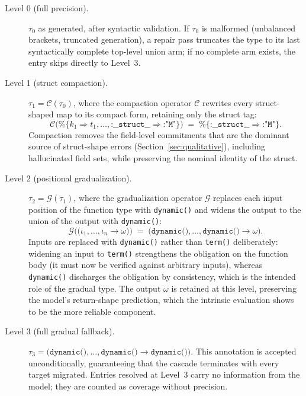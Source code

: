 \begin{description}
    \item[Level 0 (full precision).]
    $\tau_0$ as generated, after syntactic validation.
    If $\tau_0$ is malformed (unbalanced brackets, truncated generation), a repair pass truncates the type to its last syntactically complete top-level union arm; if no complete arm exists, the entry skips directly to Level~3.

    \item[Level 1 (struct compaction).]
    $\tau_1 = \mathcal{C}(\tau_0)$, where the compaction operator $\mathcal{C}$ rewrites every struct-shaped map to its compact form, retaining only the struct tag:
    \[
    \mathcal{C}\bigl(\texttt{\%\{}k_1 \Rightarrow t_1, \ldots, \texttt{:\_\_struct\_\_} \Rightarrow \texttt{:"M"}\texttt{\}}\bigr)
    \;=\;
    \texttt{\%\{:\_\_struct\_\_} \Rightarrow \texttt{:"M"\}}.
    \]
    Compaction removes the field-level commitments that are the dominant source of struct-shape errors (Section~\ref{sec:qualitative}), including hallucinated field sets, while preserving the nominal identity of the struct.

    \item[Level 2 (positional gradualization).]
    $\tau_2 = \mathcal{G}(\tau_1)$, where the gradualization operator $\mathcal{G}$ replaces each input position of the function type with \texttt{dynamic()} and widens the output to the union of the output with \texttt{dynamic()}:
    \[
    \mathcal{G}\bigl(\texttt{(} \iota_1, \ldots, \iota_n \rightarrow \omega \texttt{)}\bigr)
    \;=\;
    \texttt{(dynamic()}, \ldots, \texttt{dynamic()} \rightarrow \omega\texttt{)}.
    \]
    Inputs are replaced with \texttt{dynamic()} rather than \texttt{term()} deliberately: widening an input to \texttt{term()} strengthens the obligation on the function body (it must now be verified against arbitrary inputs), whereas \texttt{dynamic()} discharges the obligation by consistency, which is the intended role of the gradual type.
    The output $\omega$ is retained at this level, preserving the model's return-shape prediction, which the intrinsic evaluation shows to be the more reliable component.

    \item[Level 3 (full gradual fallback).]
    $\tau_3 = \texttt{(dynamic()}, \ldots, \texttt{dynamic()} \rightarrow \texttt{dynamic())}$.
    This annotation is accepted unconditionally, guaranteeing that the cascade terminates with every target migrated.
    Entries resolved at Level~3 carry no information from the model; they are counted as coverage without precision.
\end{description}

